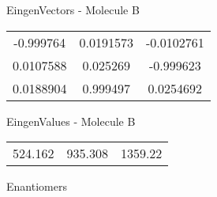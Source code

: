 \begin{multicols}{2}
\begin{center}
\vtab
 EingenVectors - Molecule B     \\
\vtab
\begin{tabular}{|c c c|}
-0.999764	 & 	0.0191573	 & 	-0.0102761	 \\
0.0107588	 & 	0.025269	 & 	-0.999623	 \\
0.0188904	 & 	0.999497	 & 	0.0254692
\end{tabular}

\vtab
 EingenValues - Molecule B     \\
\vtab
\begin{tabular}{|c c c|}
524.162	 & 	935.308	 & 	1359.22	 \\
\end{tabular}

\end{center}
\end{multicols}
\begin{center}
\vtab
\vtab
\textcolor{NavyBlue}{\Large Enantiomers}
\end{center}

 \newpage

